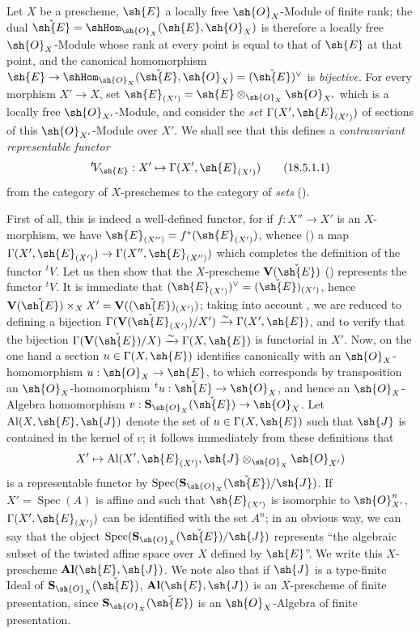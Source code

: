 \begin{env}[18.5.1]
\label{IV.18.5.1}
Let $X$ be a prescheme, $\sh{E}$ a locally free $\sh{O}_X$-Module of finite rank;
the dual $\check{\sh{E}}=\shHom_{\sh{O}_X}(\sh{E},\sh{O}_X)$ is therefore a locally free $\sh{O}_X$-Module whose rank at every point is equal to that of $\sh{E}$ at that point, and the canonical homomorphism $\sh{E}\to\shHom_{\sh{O}_X}(\check{\sh{E}},\sh{O}_X)=(\check{\sh{E}})^\vee$ is \emph{bijective}.
For every morphism $X'\to X$, set $\sh{E}_{(X')}=\sh{E}\otimes_{\sh{O}_X}\sh{O}_{X'}$ which is a locally free $\sh{O}_{X'}$-Module, and consider the \emph{set} $\Gamma(X',\sh{E}_{(X')})$ of sections of this $\sh{O}_{X'}$-Module over $X'$.
We shall see that this defines a \emph{contravariant representable functor}
\[
\label{IV.18.5.1.1}
{}^t\! V_{\sh{E}}:X'\mapsto\Gamma(X',\sh{E}_{(X')})
\tag{18.5.1.1}
\]
from the category of $X$-preschemes to the category of \emph{sets} ().

First of all, this is indeed a well-defined functor, for if $f:X''\to X'$ is an $X$-morphism, we have $\sh{E}_{(X'')}=f^*(\sh{E}_{(X')})$, whence () a map $\Gamma(X',\sh{E}_{(X')})\to\Gamma(X'',\sh{E}_{(X'')})$ which completes the definition of the functor ${}^t\! V$.
Let us then show that the $X$-prescheme $\mathbf{V}(\check{\sh{E}})$ () represents the functor ${}^t\! V$.
It is immediate that $(\sh{E}_{(X')})^\vee=(\check{\sh{E}})_{(X')}$, hence $\mathbf{V}(\check{\sh{E}})\times_X X'=\mathbf{V}((\check{\sh{E}})_{(X')})$;
taking into account , we are reduced to defining a bijection $\Gamma(\mathbf{V}(\check{\sh{E}}_{(X')})/X')\xrightarrow{\sim}\Gamma(X',\sh{E})$, and to verify that the bijection $\Gamma(\mathbf{V}(\check{\sh{E}})/X)\xrightarrow{\sim}\Gamma(X,\sh{E})$ is functorial in $X'$.
Now, on the one hand a section $u\in\Gamma(X,\sh{E})$ identifies canonically with an $\sh{O}_X$-homomorphism $u:\sh{O}_X\to\sh{E}$, to which corresponds by transposition an $\sh{O}_X$-homomorphism ${}^t u:\check{\sh{E}}\to\sh{O}_X$, and hence an $\sh{O}_X$-Algebra homomorphism $v:\mathbf{S}_{\sh{O}_X}(\check{\sh{E}})\to\sh{O}_X$.
Let $\mathrm{Al}(X,\sh{E},\sh{J})$ denote the set of $u\in\Gamma(X,\sh{E})$ such that $\sh{J}$ is contained in the kernel of $v$;
it follows immediately from these definitions that
\[
X'\mapsto\mathrm{Al}(X',\sh{E}_{(X')},\sh{J}\otimes_{\sh{O}_X}\sh{O}_{X'})
\]
is a representable functor by $\operatorname{Spec}(\mathbf{S}_{\sh{O}_X}(\check{\sh{E}})/\sh{J})$.
If $X'=\operatorname{Spec}(A)$ is affine and such that $\sh{E}_{(X')}$ is isomorphic to $\sh{O}_{X'}^n$, $\Gamma(X',\sh{E}_{(X')})$ can be identified with the set $A^n$;
in an obvious way, we can say that the object $\operatorname{Spec}(\mathbf{S}_{\sh{O}_X}(\check{\sh{E}})/\sh{J})$ represents ``the algebraic subset of the twisted affine space over $X$ defined by $\sh{E}$''.
We write this $X$-prescheme $\mathbf{Al}(\sh{E},\sh{J})$.
We note also that if $\sh{J}$ is a type-finite Ideal of $\mathbf{S}_{\sh{O}_X}(\check{\sh{E}})$, $\mathbf{Al}(\sh{E},\sh{J})$ is an $X$-prescheme of finite presentation, since $\mathbf{S}_{\sh{O}_X}(\check{\sh{E}})$ is an $\sh{O}_X$-Algebra of finite presentation.
\end{env}

